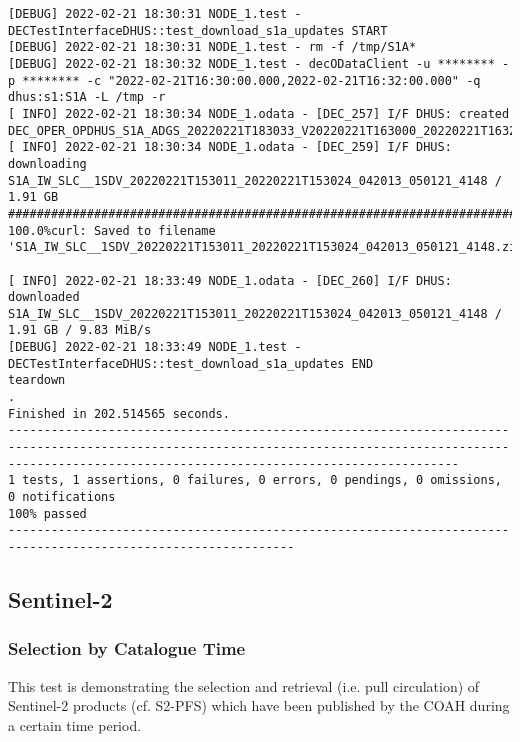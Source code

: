 \documentclass[dec_sum_main.tex]{subfiles}
\begin{document}
\begin{Verbatim}[fontsize=\tiny]
[DEBUG] 2022-02-21 18:30:31 NODE_1.test - DECTestInterfaceDHUS::test_download_s1a_updates START
[DEBUG] 2022-02-21 18:30:31 NODE_1.test - rm -f /tmp/S1A*
[DEBUG] 2022-02-21 18:30:32 NODE_1.test - decODataClient -u ******** -p ******** -c "2022-02-21T16:30:00.000,2022-02-21T16:32:00.000" -q dhus:s1:S1A -L /tmp -r
[ INFO] 2022-02-21 18:30:34 NODE_1.odata - [DEC_257] I/F DHUS: created DEC_OPER_OPDHUS_S1A_ADGS_20220221T183033_V20220221T163000_20220221T163200_1_0.xml
[ INFO] 2022-02-21 18:30:34 NODE_1.odata - [DEC_259] I/F DHUS: downloading S1A_IW_SLC__1SDV_20220221T153011_20220221T153024_042013_050121_4148 / 1.91 GB
#################################################################################################################################################################################################### 100.0%curl: Saved to filename 'S1A_IW_SLC__1SDV_20220221T153011_20220221T153024_042013_050121_4148.zip'

[ INFO] 2022-02-21 18:33:49 NODE_1.odata - [DEC_260] I/F DHUS: downloaded S1A_IW_SLC__1SDV_20220221T153011_20220221T153024_042013_050121_4148 / 1.91 GB / 9.83 MiB/s
[DEBUG] 2022-02-21 18:33:49 NODE_1.test - DECTestInterfaceDHUS::test_download_s1a_updates END
teardown
.
Finished in 202.514565 seconds.
-----------------------------------------------------------------------------------------------------------------------------------------------------------------------------------------------------------
1 tests, 1 assertions, 0 failures, 0 errors, 0 pendings, 0 omissions, 0 notifications
100% passed
--------------------------------------------------------------------------------------------------------------
\end{Verbatim}

\subsection{Sentinel-2}


\subsubsection{Selection by Catalogue Time}
This test is demonstrating the selection and retrieval (i.e. pull circulation) of Sentinel-2 products (cf. S2-PFS) which have been published by the COAH during a certain time period. \newline

 \newline
\end{document}
